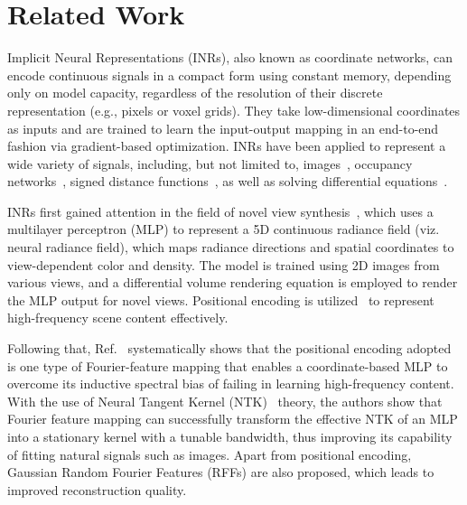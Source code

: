 \documentclass[letterpaper]{article} %
\begin{document}
\section{Related Work}
\label{sec:background}
Implicit Neural Representations (INRs), also known as coordinate networks, can encode continuous signals in a compact form using constant memory, depending only on model capacity, regardless of the resolution of their discrete representation (e.g., pixels or voxel grids). They take low-dimensional coordinates as inputs and are trained to learn the input-output mapping in an end-to-end fashion via gradient-based optimization. INRs have been applied to represent a wide variety of signals, including, but not limited to, images~\cite{saragadam2023wire,lindell2022bacon, shekarforoush2022residual}, occupancy networks~\cite{chen2019learning, mescheder2019occupancy}, signed distance functions~\cite{sitzmann2019scene, park2019deepsdf}, as well as solving differential equations~\cite{2020siren, fathony2020multiplicative}.
 
INRs first gained attention in the field of novel view synthesis~\cite{mildenhall2021nerf}, which uses a multilayer perceptron (MLP) to represent a 5D continuous radiance field (viz. neural radiance field), which maps radiance directions and spatial coordinates to view-dependent color and density. The model is trained using 2D images from various views, and a differential volume rendering equation is employed to render the MLP output for novel views. Positional encoding is utilized~\cite{vaswani2017attention} to represent high-frequency scene content effectively.

Following that, Ref.~\cite{tancik2020fourier} systematically shows that the positional encoding adopted is one type of Fourier-feature mapping that enables a coordinate-based MLP to overcome its inductive spectral bias of failing in learning high-frequency content. With the use of Neural Tangent Kernel (NTK)~\cite{jacot2018ntk} theory, the authors show that Fourier feature mapping can successfully transform the effective NTK of an MLP into a stationary kernel with a tunable bandwidth, thus improving its capability of fitting natural signals such as images. Apart from positional encoding, Gaussian Random Fourier Features (RFFs) are also proposed, which leads to improved reconstruction quality. 
\end{document}
